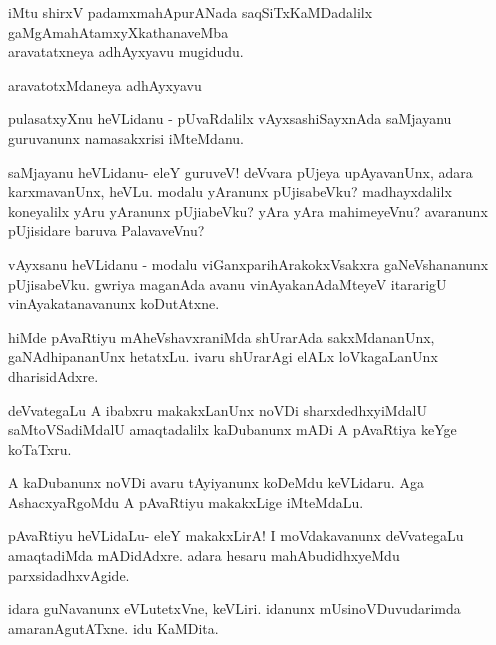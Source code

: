 \documentclass{article}
\begin{document}
\begin{center}
iMtu shirxV padamxmahApurANada saqSiTxKaMDadalilx 
gaMgAmahAtamxyXkathanaveMba\\
aravatatxneya adhAyxyavu mugidudu.
\end{center}

\begin{center}
{\textbf\large{aravatotxMdaneya adhAyxyavu}}
\end{center}


\begin{mng}%
pulasatxyXnu heVLidanu - pUvaRdalilx vAyxsashiSayxnAda saMjayanu 
guruvanunx namasakxrisi iMteMdanu.
\end{mng}

\begin{mng}%
saMjayanu heVLidanu- eleY guruveV! deVvara pUjeya upAyavanUnx, adara 
karxmavanUnx, heVLu. modalu yAranunx pUjisabeVku? madhayxdalilx 
koneyalilx yAru yAranunx pUjiabeVku? yAra yAra mahimeyeVnu? avaranunx 
pUjisidare baruva PalavaveVnu?
\end{mng}

\begin{mng}%
vAyxsanu heVLidanu - modalu viGanxparihArakokxVsakxra gaNeVshananunx 
pUjisabeVku. gwriya maganAda avanu vinAyakanAdaMteyeV itararigU 
vinAyakatanavanunx koDutAtxne.
\end{mng}

\begin{mng}%
hiMde pAvaRtiyu mAheVshavxraniMda shUrarAda sakxMdananUnx, 
gaNAdhipananUnx hetatxLu. ivaru shUrarAgi elALx loVkagaLanUnx 
dharisidAdxre.
\end{mng}

\begin{mng}%
deVvategaLu A ibabxru makakxLanUnx noVDi sharxdedhxyiMdalU 
saMtoVSadiMdalU amaqtadalilx kaDubanunx mADi A pAvaRtiya keYge 
koTaTxru.
\end{mng}

\begin{mng}%
A kaDubanunx noVDi avaru tAyiyanunx koDeMdu keVLidaru. Aga 
AshacxyaRgoMdu A pAvaRtiyu makakxLige iMteMdaLu.
\end{mng}

\begin{mng}%
pAvaRtiyu heVLidaLu- eleY makakxLirA! I moVdakavanunx deVvategaLu 
amaqtadiMda mADidAdxre. adara hesaru mahAbudidhxyeMdu 
parxsidadhxvAgide. 
\end{mng}

\begin{mng}%
idara guNavanunx eVLutetxVne, keVLiri. idanunx mUsinoVDuvudarimda 
amaranAgutATxne. idu KaMDita.
\end{mng}
\end{document}
